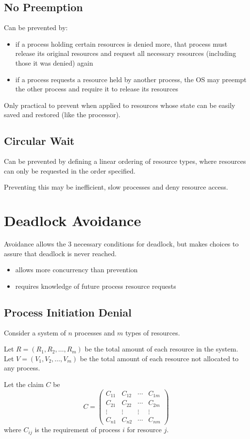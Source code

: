 \documentclass[11pt]{article}
\begin{document}
\subsection{No Preemption}
\label{sec:org3871cc9}
Can be prevented by:
\begin{itemize}
\item if a process holding certain resources is denied more, that process must release
its original resources and request all necessary resources (including those it was
denied) again
\item if a process requests a resource held by another process, the OS may preempt the
other process and require it to release its resources
\end{itemize}

Only practical to prevent when applied to resources whose state can be easily
saved and restored (like the processor).
\subsection{Circular Wait}
\label{sec:orgd964a3d}
Can be prevented by defining a linear ordering of resource types, where resources
can only be requested in the order specified.

Preventing this may be inefficient, slow processes and deny resource access.
\section{Deadlock Avoidance}
\label{sec:orgdd7012a}
Avoidance allows the 3 necessary conditions for deadlock, but makes choices
to assure that deadlock is never reached.
\begin{itemize}
\item allows more concurrency than prevention
\item requires knowledge of future process resource requests
\end{itemize}
\subsection{Process Initiation Denial}
\label{sec:org1ff6b29}
Consider a system of \(n\) processes and \(m\) types of resources.

Let \(R = (R_{1}, R_{2}, \dots, R_{m})\) be the total amount of
each resource in the system.
Let \(V = (V_{1}, V_{2}, \dots, V_{m})\) be the total amount of
each resource not allocated to any process.

Let the claim \(C\) be
$$C = \begin{pmatrix}
       C_{11} & C_{12} & \cdots & C_{1m} \\
       C_{21} & C_{22} & \cdots & C_{2m} \\
       \vdots & \vdots & \vdots & \vdots \\
       C_{n1} & C_{n2} & \cdots & C_{nm}
\end{pmatrix}$$
where \(C_{ij}\) is the requirement of process \(i\) for resource \(j\).
\end{document}

